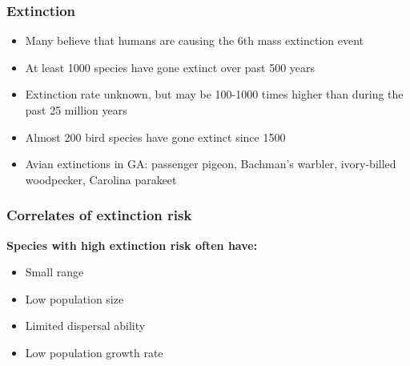 \documentclass[color=usenames,dvipsnames]{beamer}\usepackage[]{graphicx}\usepackage[]{color}
\begin{document}
\begin{frame}
  \frametitle{Extinction}
  \large
  \begin{itemize}[<+->]
    \item Many believe that humans are causing the 6th mass extinction event
    \item At least 1000 species have gone extinct over past 500 years
    \item Extinction rate unknown, but may be 100-1000 times higher
      than during the past 25 million years
    \item Almost 200 bird species have gone extinct since 1500
    \item Avian extinctions in GA: passenger
      pigeon, Bachman's warbler, ivory-billed woodpecker, Carolina parakeet
  \end{itemize}
\end{frame}



\begin{frame}
  \frametitle{Correlates of extinction risk}
  \Large
  {\bf Species with high extinction risk often have:}
  \begin{itemize}
    \item<2-> Small range
    \item<2-> Low population size
    \item<2-> Limited dispersal ability
    \item<2-> Low population growth rate
  \end{itemize}
\end{frame}
\end{document}
